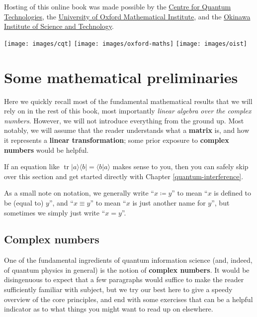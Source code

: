 \documentclass[fleqn]{article}
\let\oldsection\section
\renewcommand\section{\clearpage\oldsection}
\begin{document}
Hosting of this online book was made possible by the \href{https://cqt.quantumlah.org/}{Centre for Quantum Technologies}, the \href{https://www.maths.ox.ac.uk/}{University of Oxford Mathematical Institute}, and the \href{https://www.oist.jp/}{Okinawa Institute of Science and Technology}.

\begin{center}\texttt{[image: images/cqt]} \texttt{[image: images/oxford-maths]} \texttt{[image: images/oist]} \end{center}

\hypertarget{some-mathematical-preliminaries}{%
\section*{Some mathematical preliminaries}\label{some-mathematical-preliminaries}}

Here we quickly recall most of the fundamental mathematical results that we will rely on in the rest of this book, most importantly \emph{linear algebra over the complex numbers}.
However, we will not introduce everything from the ground up.
Most notably, we will assume that the reader understands what a \textbf{matrix} is, and how it represents a \textbf{linear transformation}; some prior exposure to \textbf{complex numbers} would be helpful.

If an equation like \(\operatorname{tr}|a\rangle\langle b|=\langle b|a\rangle\) makes sense to you, then you can safely skip over this section and get started directly with Chapter \ref{quantum-interference}.

As a small note on notation, we generally write ``\(x\coloneqq y\)'' to mean ``\(x\) is defined to be (equal to) \(y\)'', and ``\(x\equiv y\)'' to mean ``\(x\) is just another name for \(y\)'', but sometimes we simply just write ``\(x=y\)''.

\hypertarget{complex-numbers}{%
\subsection{Complex numbers}\label{complex-numbers}}

One of the fundamental ingredients of quantum information science (and, indeed, of quantum physics in general) is the notion of \textbf{complex numbers}.
It would be disingenuous to expect that a few paragraphs would suffice to make the reader sufficiently familiar with subject, but we try our best here to give a speedy overview of the core principles, and end with some exercises that can be a helpful indicator as to what things you might want to read up on elsewhere.
\end{document}
